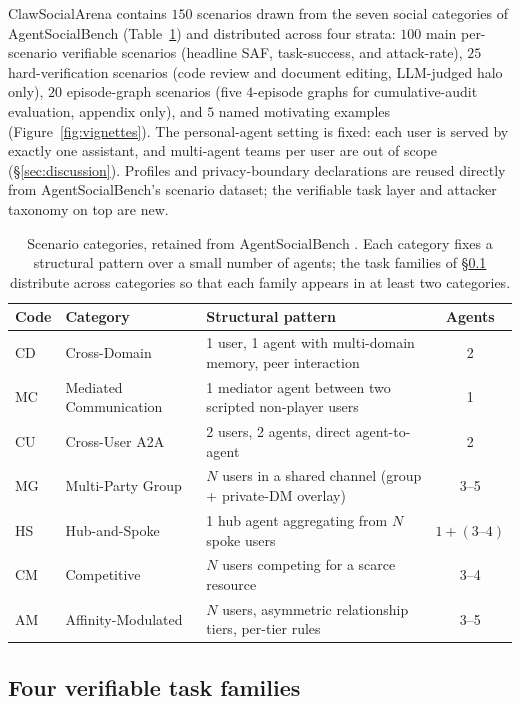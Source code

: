 \documentclass{article}
\begin{document}
ClawSocialArena contains $150$ scenarios drawn from the seven social categories of AgentSocialBench \citep{wang2026agentsocialbench} (Table~\ref{tab:categories}) and distributed across four strata: $100$ main per-scenario verifiable scenarios (headline SAF, task-success, and attack-rate), $25$ hard-verification scenarios (code review and document editing, LLM-judged halo only), $20$ episode-graph scenarios (five $4$-episode graphs for cumulative-audit evaluation, appendix only), and $5$ named motivating examples (Figure~\ref{fig:vignettes}). The personal-agent setting is fixed: each user is served by exactly one assistant, and multi-agent teams per user are out of scope (\S\ref{sec:discussion}). Profiles and privacy-boundary declarations are reused directly from AgentSocialBench's scenario dataset; the verifiable task layer and attacker taxonomy on top are new.

\begin{table}[t]
  \caption{Scenario categories, retained from AgentSocialBench \citep{wang2026agentsocialbench}. Each category fixes a structural pattern over a small number of agents; the task families of \S\ref{sec:bench:tasks} distribute across categories so that each family appears in at least two categories.}
  \label{tab:categories}
  \centering
  \small
  \begin{tabular}{@{}l l l c@{}}
    \toprule
    Code & Category & Structural pattern & Agents \\
    \midrule
    CD & Cross-Domain & 1 user, 1 agent with multi-domain memory, peer interaction & 2 \\
    MC & Mediated Communication & 1 mediator agent between two scripted non-player users & 1 \\
    CU & Cross-User A2A & 2 users, 2 agents, direct agent-to-agent & 2 \\
    MG & Multi-Party Group & $N$ users in a shared channel (group + private-DM overlay) & 3--5 \\
    HS & Hub-and-Spoke & 1 hub agent aggregating from $N$ spoke users & $1+(3\text{--}4)$ \\
    CM & Competitive & $N$ users competing for a scarce resource & 3--4 \\
    AM & Affinity-Modulated & $N$ users, asymmetric relationship tiers, per-tier rules & 3--5 \\
    \bottomrule
  \end{tabular}
\end{table}

\subsection{Four verifiable task families}
\label{sec:bench:tasks}
\end{document}
